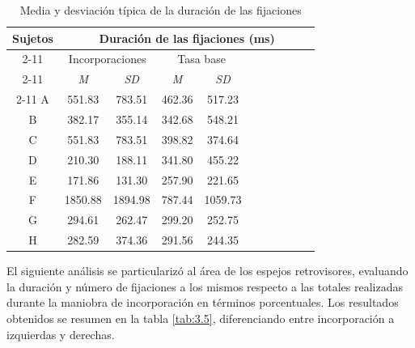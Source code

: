 \newpage
\begin{table}[h]
\centering
\begin{tabular}{@{}cccccccccll@{}}
\multirow{5}{*}{\textbf{Sujetos}} & \multicolumn{10}{c}{\textbf{Duración de las fijaciones (ms)}}                       \\ \cmidrule(l){2-11} 
                                           & \multicolumn{2}{c|}{Incorporaciones}                      & \multicolumn{2}{c}{Tasa   base}                                  \\ \cmidrule(l){2-11} 
                                           & \textit{M} & \multicolumn{1}{c|}{\textit{SD}} & \textit{M} & \multicolumn{1}{c}{\textit{SD}} \\ \cmidrule(l){2-11} 
{A}                                 & 551.83     & \multicolumn{1}{c|}{783.51}      & 462.36     & \multicolumn{1}{c}{517.23}      \\ \midrule
{B}                                 & 382.17     & \multicolumn{1}{c|}{355.14}      & 342.68     & \multicolumn{1}{c}{548.21}      \\ \midrule
{C}                                 & 551.83     & \multicolumn{1}{c|}{783.51}      & 398.82     & \multicolumn{1}{c}{374.64}      \\ \midrule
{D}                                 & 210.30     & \multicolumn{1}{c|}{188.11}      & 341.80     & \multicolumn{1}{c}{455.22}     \\ \midrule
{E}                                 & 171.86     & \multicolumn{1}{c|}{131.30}      & 257.90     & \multicolumn{1}{c}{221.65}       \\ \midrule
{F}                                 & 1850.88    & \multicolumn{1}{c|}{1894.98}     & 787.44     & \multicolumn{1}{c}{1059.73}       \\ \midrule
G                                   & 294.61     & \multicolumn{1}{c|}{262.47}      & 299.20     & \multicolumn{1}{c}{252.75}     \\ \midrule
H                                   & 282.59     & \multicolumn{1}{c|}{374.36}      & 291.56     & \multicolumn{1}{c}{244.35}       \\ \midrule
\end{tabular}
\caption{Media y desviación típica de la duración de las fijaciones}
\label{tab:3.4}
\end{table}

El siguiente análisis se particularizó al área de los espejos retrovisores, evaluando la duración y número de fijaciones a los mismos respecto a las totales realizadas durante la maniobra de incorporación en términos porcentuales. Los resultados obtenidos se resumen en la tabla \ref{tab:3.5}, diferenciando entre incorporación a izquierdas y derechas.

